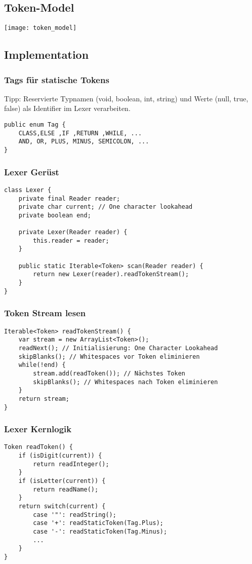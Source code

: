 \subsection{Token-Model}
\texttt{[image: token\_model]}

\subsection{Implementation}
\subsubsection{Tags für statische Tokens}
Tipp: Reservierte Typnamen (void, boolean, int, string) und Werte (null, true, false) als Identifier im Lexer verarbeiten.
\begin{lstlisting}
public enum Tag {
    CLASS,ELSE ,IF ,RETURN ,WHILE, ...
    AND, OR, PLUS, MINUS, SEMICOLON, ...
}
\end{lstlisting}

\subsubsection{Lexer Gerüst}
\begin{lstlisting}
class Lexer {
    private final Reader reader;
    private char current; // One character lookahead
    private boolean end;

    private Lexer(Reader reader) {
        this.reader = reader;
    }

    public static Iterable<Token> scan(Reader reader) {
        return new Lexer(reader).readTokenStream();
    }
}
\end{lstlisting}

\subsubsection{Token Stream lesen}
\begin{lstlisting}
Iterable<Token> readTokenStream() {
    var stream = new ArrayList<Token>();
    readNext(); // Initialisierung: One Character Lookahead
    skipBlanks(); // Whitespaces vor Token eliminieren
    while(!end) {
        stream.add(readToken()); // Nächstes Token
        skipBlanks(); // Whitespaces nach Token eliminieren
    }
    return stream;
}
\end{lstlisting}

\subsubsection{Lexer Kernlogik}
\begin{lstlisting}
Token readToken() {
    if (isDigit(current)) {
        return readInteger();
    }
    if (isLetter(current)) {
        return readName();
    }
    return switch(current) {
        case '"': readString();
        case '+': readStaticToken(Tag.Plus);
        case '-': readStaticToken(Tag.Minus);
        ...
    }
}
\end{lstlisting}